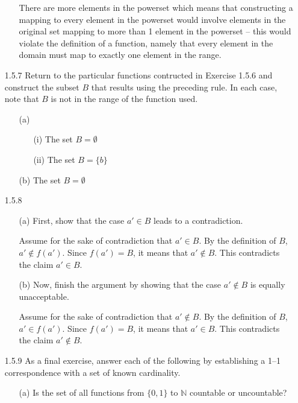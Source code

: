 \documentclass[12pt,letterpaper]{article}
\begin{document}
\begin{itemize}[leftmargin=!,labelindent=5pt]
\begin{itemize}
                There are more elements in the powerset which means that constructing a mapping to every element in the powerset would involve elements in the original set mapping to more than 1 element in the powerset -- this would violate the definition of a function, namely that every element in the domain must map to exactly one element in the range.
            \end{itemize}
        \item[1.5.7] Return to the particular functions contructed in Exercise 1.5.6 and construct the subset $B$ that results using the preceding rule. In each case, note that $B$ is not in the range of the function used.
            \begin{itemize}
                \item [(a)]
                \begin{itemize}
                    \item [(i)] The set $B = \emptyset$
                    \item [(ii)] The set $B = \{b\}$
                \end{itemize}
                \item [(b)] The set $B = \emptyset$
            \end{itemize}
        \item[1.5.8]
            \begin{itemize}
                \item [(a)] First, show that the case $a' \in B$ leads to a contradiction.
                
                Assume for the sake of contradiction that $a' \in B$.
                By the definition of $B$, $a' \notin f(a')$.
                Since $f(a') = B$, it means that $a' \notin B$.
                This contradicts the claim $a' \in B$.
                \item [(b)] Now, finish the argument by showing that the case $a' \notin B$ is equally unacceptable.
                
                Assume for the sake of contradiction that $a' \notin B$.
                By the definition of $B$, $a' \in f(a')$.
                Since $f(a') = B$, it means that $a' \in B$.
                This contradicts the claim $a' \notin B$.
            \end{itemize}
        \item[1.5.9] As a final exercise, answer each of the following by establishing a 1–1 correspondence with a set of known cardinality.
            \begin{itemize}
                \item [(a)] Is the set of all functions from $\{0, 1\}$ to $\mathbb{N}$ countable or uncountable?
                

\end{itemize}
\end{itemize}
\end{document}
